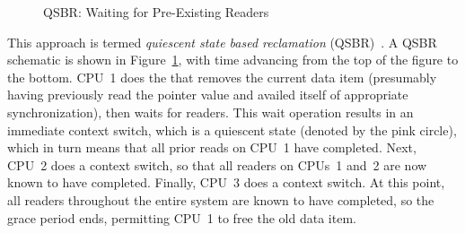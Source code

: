 \begin{figure}[tb]
\centering
{}
\caption{QSBR: Waiting for Pre-Existing Readers}
\label{fig:defer:QSBR: Waiting for Pre-Existing Readers}
\end{figure}

This approach is termed \emph{quiescent state based reclamation}
(QSBR)~\cite{ThomasEHart2006a}.
A QSBR schematic is shown in
Figure~\ref{fig:defer:QSBR: Waiting for Pre-Existing Readers},
with time advancing from the top of the figure to the bottom.
CPU~1 does the  that removes the current data
item (presumably having previously read the pointer value and
availed itself of appropriate synchronization), then waits
for readers.
This wait operation results in an immediate context switch, which is a
quiescent state (denoted by the pink circle), which in turn means that
all prior reads on CPU~1 have completed.
Next, CPU~2 does a context switch, so that all readers on CPUs~1 and~2
are now known to have completed.
Finally, CPU~3 does a context switch.
At this point, all readers throughout the entire system are known to
have completed, so the grace period ends, permitting CPU~1 to free
the old data item.

